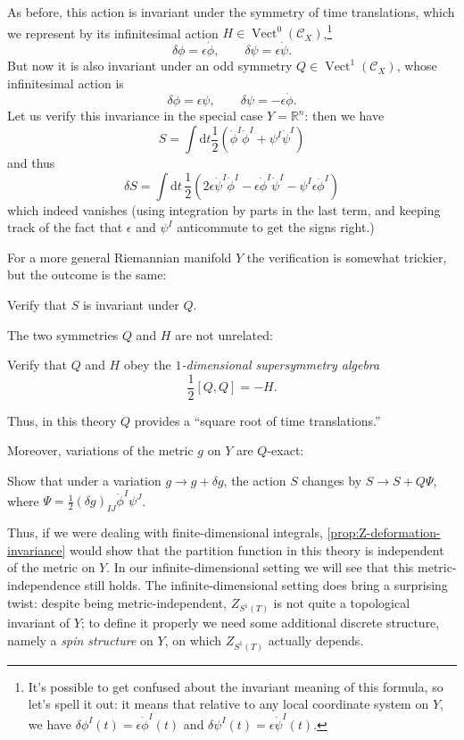 \documentclass[12pt,letterpaper,reqno]{article}
\numberwithin{equation}{section}
\newcommand{\cC}{\ensuremath{\mathcal C}}
\newcommand{\R}{\ensuremath{\mathbb R}}
\newcommand{\half}{\ensuremath{\frac{1}{2}}}
\newcommand{\de}{\mathrm{d}}
\newcommand{\eps}{\epsilon}
\newcommand{\ti}[1]{\textit{#1}}
\DeclareMathOperator{\Vect}{Vect}
\newcommand{\fixme}[1]{{\color{orange}{[#1]}}}
\begin{document}
As before, this action is invariant under the symmetry of time translations,
which we represent by its infinitesimal action $H \in \Vect^0(\cC_X)$,\footnote{It's possible to 
get confused about the invariant meaning of this formula, so let's spell it out:
it means that relative to any local coordinate system on $Y$, we have
$\delta \phi^I(t) = \eps \dot\phi^I(t)$ and $\delta \psi^I(t) = \eps \dot \psi^I(t)$.}
\begin{equation}
  \delta \phi = \eps \dot\phi, \qquad \delta \psi = \eps \dot\psi.
\end{equation}
But now it is also invariant under an odd symmetry $Q \in \Vect^1(\cC_X)$,
whose infinitesimal action is
\begin{equation}
  \delta \phi = \eps \psi, \qquad \delta \psi = - \eps \dot\phi.
\end{equation}
Let us verify this invariance in the special case $Y = \R^n$:
then we have
\begin{equation}
  S = \int \de t \half (\dot\phi^I \dot\phi^I + \psi^I \dot \psi^I)
\end{equation}
and thus
\begin{equation}
  \delta S = \int \de t \, \half (2 \eps \dot\psi^I \dot\phi^I - \eps \dot\phi^I \dot\psi^I - \psi^I \eps \ddot \phi^I)
\end{equation}
which indeed vanishes (using integration by parts in the last term,
and keeping track of the fact that $\eps$ and $\psi^I$ anticommute
to get the signs right.)

For a more general Riemannian manifold $Y$ the verification is
somewhat trickier, but the outcome is the same:
\begin{exercise}
Verify that $S$ is invariant under $Q$.
\end{exercise}

The two symmetries $Q$ and $H$ are not unrelated:
\begin{exercise}
Verify that $Q$ and $H$ obey the \ti{$1$-dimensional supersymmetry algebra}
\begin{equation}
  \half [Q,Q] = -H.
\end{equation}
\end{exercise}
Thus, in this theory $Q$ provides a ``square root of time translations.''

Moreover, variations of the metric $g$ on $Y$ are $Q$-exact:
\begin{exercise}
Show that under a variation $g \to g + \delta g$,
the action $S$ changes by $S \to S + Q \Psi$, where 
$\Psi = \half (\delta g)_{IJ} \dot \phi^I \psi^J$. \fixme{check}
\end{exercise}
Thus, if we were dealing with finite-dimensional integrals, 
\autoref{prop:Z-deformation-invariance} would show 
that the partition function in this theory
is independent of the metric on $Y$. In our infinite-dimensional
setting we will see that this metric-independence still holds.
The infinite-dimensional setting does bring a surprising twist:
despite being metric-independent, 
$Z_{S^1(T)}$ is not quite a topological invariant of $Y$; to define 
it properly we need some additional discrete structure,
namely a \ti{spin structure} on $Y$, on which $Z_{S^1(T)}$
actually depends.
\end{document}
